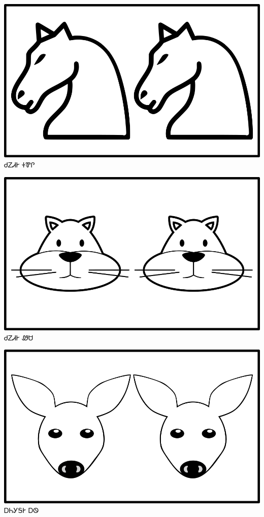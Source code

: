 \documentclass[avery5371]{flashcards}%
\begin{document}
    \begin{flashcard}{
        \includegraphics[width=0.95\columnwidth,height=.51\columnwidth,keepaspectratio]{../artwork/objects-animate/anitali-soquili}
    }
        \Huge ᏧᏃᏗᎨ ᏐᏈᎵ
    \end{flashcard}

    \begin{flashcard}{
        \includegraphics[width=0.95\columnwidth,height=.51\columnwidth,keepaspectratio]{../artwork/objects-animate/anitali-wesa}
    }
        \Huge ᏧᏃᏗᎨ ᏪᏌ
    \end{flashcard}

    \begin{flashcard}{
        \includegraphics[width=0.95\columnwidth,height=.51\columnwidth,keepaspectratio]{../artwork/objects-animate/anitali-ahwi}
    }
        \Huge ᎠᏂᎩᎦᎨ ᎠᏫ
    \end{flashcard}
\end{document}
